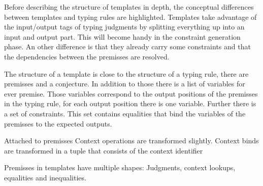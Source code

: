 Before describing the structure of templates in depth, the conceptual
differences between templates and typing rules are highlighted.
Templates take advantage of the input/output tags of typing judgments
by splitting everything up into an input and output part. This will
become handy in the constraint generation phase. An other difference
is that they already carry some constraints and that the dependencies
between the premisses are resolved.

The structure of a template is close to the structure of a typing
rule, there are premisses and a conjecture. In addition to those there
is a list of variables for ever premise. Those variables correspond to
the output positions of the premisses in the typing rule, for each
output position there is one variable. Further there is a set of
constraints. This set contains equalities that bind the variables of
the premisses to the expected outputs.

Attached to premisses Context operations are transformed slightly. Context binds are
transformed in a tuple that consists of the context identifier

Premisses in templates have multiple shapes: Judgments, context
lookups, equalities and inequalities.

